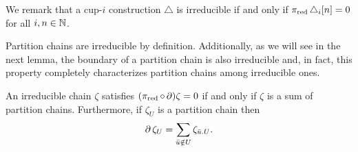 We remark that a cup-$i$ construction $\triangle$ is irreducible if and only if $\operatorname{\pi_{\text{red}}}\triangle_i[n] = 0$ for all $i,n \in \mathbb{N}$.

Partition chains are irreducible by definition.
Additionally, as we will see in the next lemma, the boundary of a partition chain is also irreducible and, in fact, this property completely characterizes partition chains among irreducible ones.

\begin{lemma}\label{l:partition chains}
	An irreducible chain $\zeta$ satisfies $(\operatorname{\pi_{\text{red}}} \circ \operatorname{\partial})\zeta = 0$ if and only if $\zeta$ is a sum of partition chains.
	Furthermore, if $\zeta_U$ is a partition chain then
	\begin{equation}\label{eq:boundary_partition_chain}
		\operatorname{\partial} \zeta_U = \sum_{\bar u \notin U} \zeta_{\bar u.U}.
	\end{equation}
\end{lemma}

